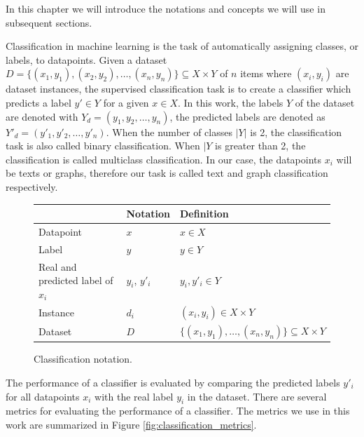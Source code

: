 In this chapter we will introduce the notations and concepts we will use in subsequent sections.


Classification in machine learning is the task of automatically assigning classes, or labels, to datapoints.
Given a dataset $D = \{(x_1, y_1), (x_2, y_2), \ldots, (x_n, y_n) \} \subseteq X \times Y$ of $n$ items where $(x_i, y_i)$ are dataset instances, the supervised classification task is to create a classifier which predicts a label $y' \in Y$ for a given $x \in X$.
In this work, the labels $Y$ of the dataset are denoted with $Y_d = (y_1, y_2, \ldots, y_n )$, the predicted labels are denoted as $Y'_d = (y'_1, y'_2, \ldots, y'_n )$.
When the number of classes $|Y|$ is 2, the classification task is also called binary classification. When $|Y$ is greater than 2, the classification is called multiclass classification.
In our case, the datapoints $x_i$ will be texts or graphs, therefore our task is called text and graph classification respectively.

\begin{figure}[ht]
\centering
\begin{tabular}{lll}
 & Notation & Definition \\
\toprule
Datapoint & $x$ & $x \in X$
\\
Label & $y$ & $y \in Y$
\\
Real and predicted label of $x_i$ & $y_i$, $y'_i$ &  $y_i, y'_i \in Y$
\\
Instance & $d_i$ & $(x_i, y_i) \in X \times Y$
\\
Dataset & $D$ & $\{(x_1, y_1), \ldots, (x_n, y_n) \} \subseteq X \times Y$ 
\end{tabular}
\caption{Classification notation.}
\end{figure}

The performance of a classifier is evaluated by comparing the predicted labels $y'_i$ for all datapoints $x_i$ with the real label $y_i$ in the dataset.
There are several metrics for evaluating the performance of a classifier.
The metrics we use in this work are summarized in Figure \ref{fig:classification_metrics}.

